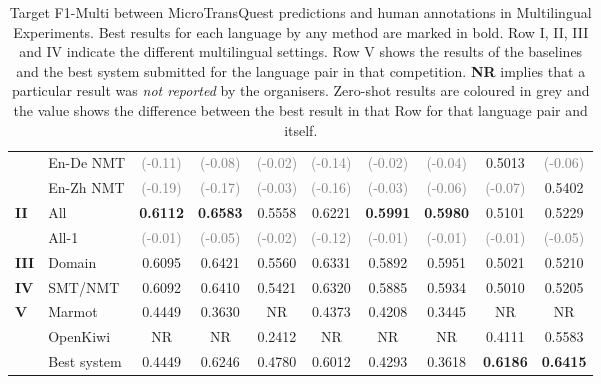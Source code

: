 \begin{table}[t]
\begin{center}
{\begin{tabular}{l l c c c c c c c c}
				& En-De NMT & \textcolor{gray}{(-0.11)} &  \textcolor{gray}{(-0.08)} & \textcolor{gray}{(-0.02)} & \textcolor{gray}{(-0.14)} & \textcolor{gray}{(-0.02)}  & \textcolor{gray}{(-0.04)} & 0.5013 &  \textcolor{gray}{(-0.06)} \\
				& En-Zh NMT & \textcolor{gray}{(-0.19)} &  \textcolor{gray}{(-0.17)} & \textcolor{gray}{(-0.03)} & \textcolor{gray}{(-0.16)} & \textcolor{gray}{(-0.03)}  & \textcolor{gray}{(-0.06)} & \textcolor{gray}{(-0.07)} & 0.5402 \\
				\midrule
				\multirow{2}{*}{\bf II} & All & \textbf{0.6112} &  \textbf{0.6583} & 0.5558 & 0.6221 & \textbf{0.5991} & \textbf{0.5980} & 0.5101 & 0.5229\\
				& All-1 & \textcolor{gray}{(-0.01)} &  \textcolor{gray}{(-0.05)} & \textcolor{gray}{(-0.02)} & \textcolor{gray}{(-0.12)} & \textcolor{gray}{(-0.01)} & \textcolor{gray}{(-0.01)} & \textcolor{gray}{(-0.01)} & \textcolor{gray}{(-0.05)} \\
				\midrule
				\multirow{1}{*}{\bf III} & Domain & 0.6095 &  0.6421 & 0.5560 & 0.6331 & 0.5892 & 0.5951  & 0.5021 &  0.5210 \\
				\midrule
				\multirow{1}{*}{\bf IV} & SMT/NMT & 0.6092 &  0.6410 & 0.5421 & 0.6320 & 0.5885 & 0.5934 & 0.5010 & 0.5205 \\
				\midrule
				\multirow{3}{*}{\bf V} & Marmot & 0.4449 &  0.3630 & NR & 0.4373 & 0.4208 & 0.3445 & NR & NR \\
				& OpenKiwi & NR &  NR & 0.2412 & NR & NR & NR & 0.4111 & 0.5583 \\
				& Best system & 0.4449 &  0.6246 & 0.4780 & 0.6012 & 0.4293 & 0.3618 & \textbf{0.6186} & \textbf{0.6415} \\
				\bottomrule
			\end{tabular}
		}
	\end{center}
	\caption[Multilingual Target F1-Multi between the MicroTransQuest predictions and human annotations]{Target F1-Multi between MicroTransQuest predictions and human annotations in Multilingual Experiments. Best results for each language by any method are marked in bold. Row I, II, III and IV indicate the different multilingual settings. Row V shows the results of the baselines and the best system submitted for the language pair in that competition. \textbf{NR} implies that a particular result was \textit{not reported} by the organisers. Zero-shot results are coloured in grey and the value shows the difference between the best result in that Row for that language pair and itself.} 
	\label{tab:multilingual_mt_prediction}
\end{table}


